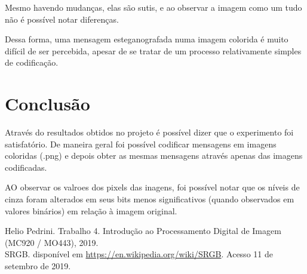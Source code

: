 \documentclass[conference]{IEEEtran}
\begin{document}
    Mesmo havendo mudanças, elas são sutis, e ao observar a imagem como um tudo não é possível notar diferenças.

    Dessa forma, uma mensagem esteganografada numa imagem colorida é muito difícil de ser percebida, apesar de se tratar de um processo relativamente simples de codificação.

\section{Conclusão}

    Através do resultados obtidos no projeto é possível dizer que o experimento foi satisfatório.
    De maneira geral foi possível codificar mensagens em imagens coloridas (.png) e depois obter as mesmas mensagens através apenas das imagens codificadas.

    AO observar os valroes dos pixels das inagens, foi possível notar que os níveis de cinza foram alterados em seus bits menos significativos (quando observados em valores binários) em relação à imagem original.


\begin{thebibliography}{00}

   Helio Pedrini. Trabalho 4. Introdução ao Processamento Digital de Imagem (MC920 / MO443), 2019.\\

   SRGB. disponível em \url{https://en.wikipedia.org/wiki/SRGB}. Acesso 11 de setembro de 2019.

\end{thebibliography}
\end{document}
